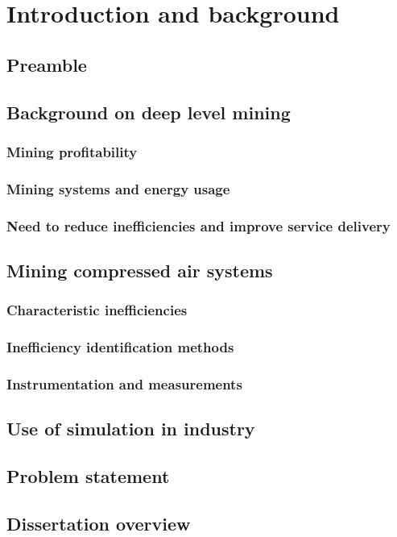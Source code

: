 \chapter{Introduction and background}  %
\setcounter{page}{1}
\section{Preamble}

\section{Background on deep level mining}
\subsection{Mining profitability}
\subsection{Mining systems and energy usage}
\subsection{Need to reduce inefficiencies and improve service delivery}
\section{Mining compressed air systems}
	\subsection{Characteristic inefficiencies}
	\subsection{Inefficiency identification methods}
	\subsection{Instrumentation and measurements}
\section{Use of simulation in industry}
\section{Problem statement}
\section{Dissertation overview}